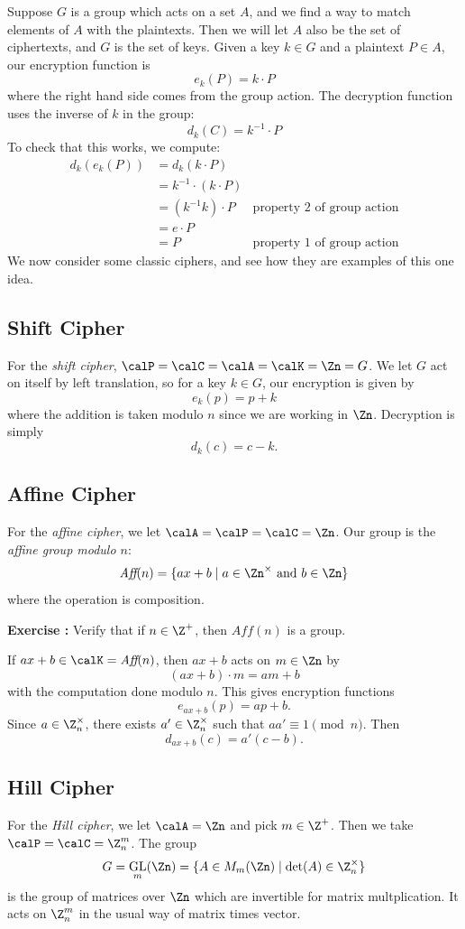 \documentclass[12pt]{amsart}
\DeclareMathOperator{\GL}{GL}
\newcounter{probs}
\newenvironment{prob}{%
  \refstepcounter{probs}
  \par\medskip\noindent\textbf{Exercise \theprobs:} }{\par\medskip}
\theoremstyle{plain}
\theoremstyle{definition}
\theoremstyle{remark}
\begin{document}
Suppose $G$ is a group which acts on a set $A$, and we find a
way to match elements of $A$ with the plaintexts.  Then we will let
$A$ also be the set of ciphertexts, and $G$ is the set of keys.  Given
a key $k\in G$ and a plaintext $P\in A$, our encryption function is
\[ e_k(P) = k\cdot P\]
where the right hand side comes from the group action.  The decryption
function uses the inverse of $k$ in the group:
\[ d_k(C) = k^{-1}\cdot P\]
To check that this works, we compute:
\begin{align*}
d_k(e_k(P)) &= d_k(k\cdot P) \\
  &= k^{-1}\cdot (k\cdot P) \\
  &= (k^{-1}k)\cdot P & \text{property 2 of group action} \\
  &= e\cdot P \\
  &= P & \text{property 1 of group action}
\end{align*}
We now consider some classic ciphers, and see how they are examples of
this one idea.
\subsection{Shift Cipher}
For the \emph{shift cipher},
$\calP=\calC=\calA=\calK=\Zn=G$.
We let $G$ act on itself by left
translation, so for a key $k\in G$, our encryption is given by
\[ e_k(p) = p+k\]
where the addition is taken modulo $n$ since we are working in $\Zn$.
Decryption is simply
\[ d_k(c) = c-k.\]


\subsection{Affine Cipher}
For the \emph{affine cipher}, we let $\calA=\calP=\calC=\Zn$.
Our group is
the \emph{affine group modulo $n$}:
\[ \textit{Aff}(n) = \{ ax+b\mid a\in \Zn^\times\text{ and } b\in\Zn\}\]
where the operation is composition.
\begin{prob}
  Verify that if $n\in\Z^+$, then $\textit{Aff}(n)$ is a group.
\end{prob}
If $ax+b\in \calK= \textit{Aff}(n)$, then $ax+b$ acts on $m\in \Zn$ by
\[ (ax+b)\cdot m = am+b\]
with the computation done modulo $n$.  This gives encryption functions
\[ e_{ax+b}(p) = ap+b.\]
Since $a\in \Z_n^\times$,
there exists $a'\in\Z_n^\times$ such that $aa'\equiv 1\pmod n$.  Then
\[d_{ax+b}(c) = a'(c-b).\]

\subsection{Hill Cipher}
For the \emph{Hill cipher}, we let $\calA=\Zn$ and pick
$m\in\Z^+$.  Then we take $\calP=\calC=\Z_n^m$.
The group 
\[ G=\GL_m(\Zn)=\{A\in M_m(\Zn)\mid \det(A)\in \Z_n^\times\}\]
is the group of matrices over $\Zn$ which are invertible for matrix
multplication.  It acts on $\Z_n^m$ in the usual way of matrix times
vector.
\end{document}
